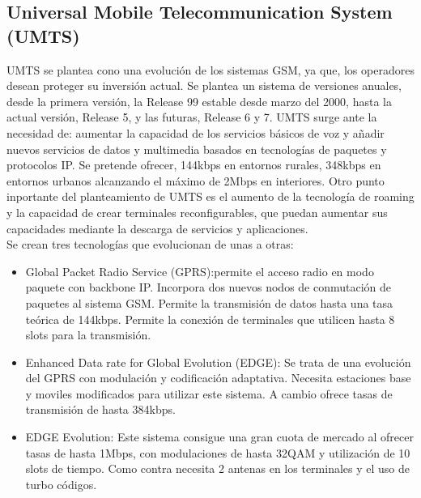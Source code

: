 \subsection{Universal Mobile Telecommunication System (\acrshort{UMTS})}
\label{sub:UMTS}
\acrshort{UMTS} se plantea cono una evolución de los sistemas \acrshort{GSM}, ya que, los operadores desean proteger su inversión actual. Se plantea un sistema de versiones anuales, desde la primera versión, la Release 99 estable desde marzo del 2000, hasta la actual versión, Release 5, y las futuras, Release 6 y 7. \acrshort{UMTS} surge ante la necesidad de: aumentar la capacidad de los servicios básicos de voz y añadir nuevos servicios de datos y multimedia basados en tecnologías de paquetes y protocolos IP. Se pretende ofrecer, 144kbps en entornos rurales, 348kbps en entornos urbanos alcanzando el máximo de 2Mbps en interiores. Otro punto inportante del planteamiento de \acrshort{UMTS} es el aumento de la tecnología de roaming y la capacidad de crear terminales reconfigurables, que puedan aumentar sus capacidades mediante la descarga de servicios y aplicaciones.\\
Se crean tres tecnologías que evolucionan de unas a otras:
\begin{itemize}
	\item Global Packet Radio Service (\acrshort{GPRS}):permite el acceso radio en modo paquete con backbone IP. Incorpora dos nuevos nodos de conmutación de paquetes al sistema \acrshort{GSM}. Permite la transmisión de datos hasta una tasa teórica de 144kbps. Permite la conexión de terminales que utilicen hasta 8 slots para la transmisión.
	\item Enhanced Data rate for Global Evolution (\acrshort{EDGE}): Se trata de una evolución del \acrshort{GPRS} con modulación y codificación adaptativa. Necesita estaciones base y moviles modificados para utilizar este sistema. A cambio ofrece tasas de transmisión de hasta 384kbps.
	\item \acrshort{EDGE} Evolution: Este sistema consigue una gran cuota de mercado al ofrecer tasas de hasta 1Mbps, con modulaciones de hasta 32QAM y utilización de 10 slots de tiempo. Como contra necesita 2 antenas en los terminales y el uso de turbo códigos.
\end{itemize}
